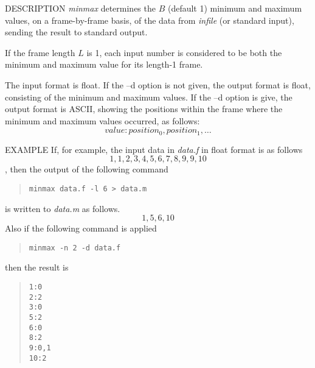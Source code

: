 \begin{synopsis}
 \item [minmax] [ --l $L$ ] [ --n $N$ ] [ --b $B$ ] [ --d ] [ {\em infile} ]
\end{synopsis}

\begin{qsection}{DESCRIPTION}
{\em minmax} determines the $B$ (default 1) minimum and maximum values, 
on a frame-by-frame basis, 
of the data from {\em infile} (or standard input), 
sending the result to standard output.

If the frame length $L$ is 1, 
each input number is considered to be both
the minimum and maximum value for its length-1 frame.

The input format is float. 
If the --d option is not given, 
the output format is float, 
consisting of the minimum and maximum values.
If the --d option is give, 
the output format is ASCII, 
showing the positions within the frame 
where the minimum and maximum values occurred, as follows:
\begin{displaymath}
value:position_0,position_1,\dots
\end{displaymath}
\end{qsection}

\begin{options}
\end{options}

\begin{qsection}{EXAMPLE}
If, for example, the input data in {\em data.f} in float format
is as follows
\[1,1,2,3,4,5,6,7,8,9,9,10\],
then the output of the following command
\begin{quote}
 \verb!minmax data.f -l 6 > data.m!
\end{quote}
is written to {\em data.m} as follows.
\[1,5,6,10\]
Also if the following command is applied
\begin{quote}
 \verb!minmax -n 2 -d data.f!
\end{quote}
then the result is 
\begin{quote}
 \verb!1:0!\\
 \verb!2:2!\\
 \verb!3:0!\\
 \verb!5:2!\\
 \verb!6:0!\\
 \verb!8:2!\\
 \verb!9:0,1!\\
 \verb!10:2!
\end{quote}
\end{qsection}
